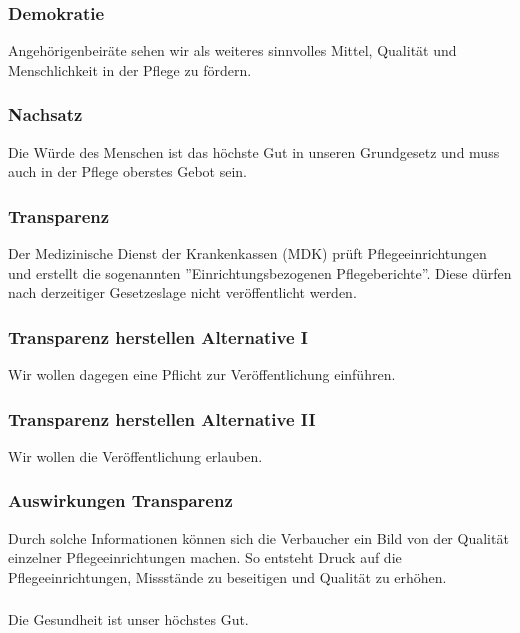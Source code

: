 \subsubsection{Demokratie}
\abstimmung
Angehörigenbeiräte sehen wir als weiteres sinnvolles Mittel, Qualität und Menschlichkeit in der Pflege zu fördern.

\subsubsection{Nachsatz}
\abstimmung
Die Würde des Menschen ist das höchste Gut in unseren Grundgesetz und muss auch in der Pflege oberstes Gebot sein.

\subsubsection{Transparenz}
\abstimmung
Der Medizinische Dienst der Krankenkassen (MDK) prüft Pflegeeinrichtungen und erstellt die sogenannten ''Einrichtungsbezogenen Pflegeberichte''. Diese dürfen nach derzeitiger Gesetzeslage nicht veröffentlicht werden.

\subsubsection{Transparenz herstellen Alternative I}
\abstimmung
Wir wollen dagegen eine Pflicht zur Veröffentlichung einführen.

\subsubsection{Transparenz herstellen Alternative II}
\abstimmung
Wir wollen die Veröffentlichung erlauben.

\subsubsection{Auswirkungen Transparenz}
\abstimmung
Durch solche Informationen können sich die Verbaucher ein Bild von der Qualität einzelner Pflegeeinrichtungen machen. So entsteht Druck auf die Pflegeeinrichtungen, Missstände zu beseitigen und Qualität zu erhöhen.
 
\newpage
{}

\subsubsection{ }
\abstimmung
Die Gesundheit ist unser höchstes Gut.

